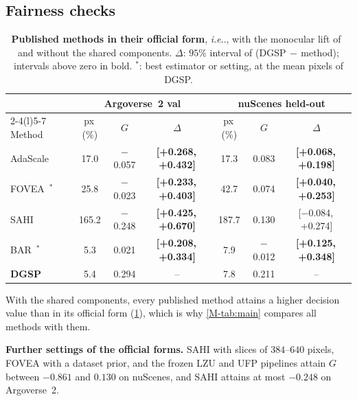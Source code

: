 \documentclass[10pt,letterpaper]{article}
\makeatletter
\DeclareRobustCommand\onedot{\futurelet\@let@token\@onedot}
\def\@onedot{\ifx\@let@token.\else.\null\fi\xspace}
\def\ie{\emph{i.e}\onedot} \def\Ie{\emph{I.e}\onedot}
\newcommand{\method}{DGSP\xspace}
\newcommand{\G}{G}
\newcommand{\ci}[2]{[#1,\allowbreak\,#2]}
\newcommand{\best}[1]{\textbf{#1}}
\newcommand{\oursrow}{\rowcolor{oursbg}}
\newcommand{\na}{--}
\theoremstyle{remark}
\theoremstyle{plain}
\theoremstyle{definition}
\makeatother
\begin{document}
\subsection{Fairness checks}
\label{sec:supp_fairness}

\begin{table}[!tbp]
\centering
\caption{\textbf{Published methods in their official form}, \ie, with the monocular lift of~\cite{deep} and without the shared components. $\Delta$: $95\%$ interval of (\method$\,-\,$method); intervals above zero in bold. $^{\ast}$: best estimator or setting, at the mean pixels of \method.}
\label{tab:official}
\footnotesize
\setlength{\tabcolsep}{1.6pt}
\begin{tabular}{@{}lcccccc@{}}
\toprule
 & \multicolumn{3}{c}{Argoverse~2 val} & \multicolumn{3}{c}{nuScenes held-out} \\
\cmidrule(lr){2-4}\cmidrule(l){5-7}
Method & px\,(\%) & $\G$ & $\Delta$ & px\,(\%) & $\G$ & $\Delta$ \\
\midrule
AdaScale~\cite{adascale} & 17.0 & $-$0.057 & \best{\ci{+0.268}{+0.432}} & 17.3 & 0.083 & \best{\ci{+0.068}{+0.198}} \\
FOVEA~\cite{fovea}$^{\ast}$ & 25.8 & $-$0.023 & \best{\ci{+0.233}{+0.403}} & 42.7 & 0.074 & \best{\ci{+0.040}{+0.253}} \\
SAHI~\cite{sahi} & 165.2 & $-$0.248 & \best{\ci{+0.425}{+0.670}} & 187.7 & 0.130 & \ci{$-$0.084}{+0.274} \\
BAR~\cite{bgtada}$^{\ast}$ & 5.3 & 0.021 & \best{\ci{+0.208}{+0.334}} & 7.9 & $-$0.012 & \best{\ci{+0.125}{+0.348}} \\
\midrule
\oursrow \textbf{\method} & 5.4 & 0.294 & \na & 7.8 & 0.211 & \na \\
\bottomrule
\end{tabular}
\end{table}

With the shared components, every published method attains a higher decision value than in its official form (\cref{tab:official}), which is why \cref*{M-tab:main} compares all methods with them.

\noindent\textbf{Further settings of the official forms.}
SAHI with slices of $384$--$640$ pixels, FOVEA with a dataset prior, and the frozen LZU and UFP pipelines attain $\G$ between $-0.861$ and $0.130$ on nuScenes, and SAHI attains at most $-0.248$ on Argoverse~2.
\end{document}
